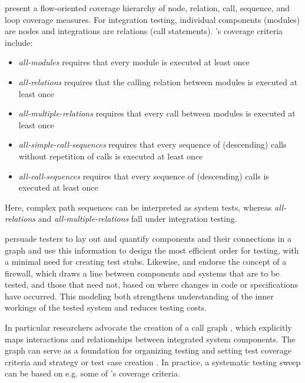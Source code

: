 \documentclass[12pt,a4paper,oneside,pdftex]{report}
\begin{document}
\citet{linnenkugel1990test} present a flow-oriented coverage hierarchy of node, relation, call, sequence, and loop coverage measures. For integration testing, individual components (modules) are nodes and integrations are relations (call statements). \citeauthor{linnenkugel1990test}'s \citeyearpar{linnenkugel1990test} coverage criteria include:
\begin{itemize}
\item \emph{all-modules} requires that every module is executed at least once 
\item \emph{all-relations} requires that the calling relation between modules is executed at least once
\item \emph{all-multiple-relations} requires that every call between modules is executed at least once
\item \emph{all-simple-call-sequences} requires that every sequence of (descending) calls without repetition of calls is executed at least once
\item \emph{all-call-sequences} requires that every sequence of (descending) calls is executed at least once
\end{itemize}
Here, complex path sequences can be interpreted as system tests, whereas \emph{all-relations} and \emph{all-multiple-relations} fall under integration testing.


\citet{hewett2009automated} persuade testers to lay out and quantify components and their connections in a graph and use this information to design the most efficient order for testing, with a minimal need for creating test stubs. Likewise, \citet{leung1990study} and \citet{abdullah1995correcting} endorse the concept of a firewall, which draws a line between components and systems that are to be tested, and those that need not, based on where changes in code or specifications have occurred. This modeling both strengthens understanding of the inner workings of the tested system and reduces testing costs.

In particular researchers advocate the creation of a call graph \citep{leung1990study, hurlburt2012not, linnenkugel1990test}, which explicitly maps interactions and relationships between integrated system components. The graph can serve as a foundation for organizing testing and setting test coverage criteria and strategy or test case creation \citep{benz2007combining, hura2011method, linnenkugel1990test}. In practice, a systematic testing sweep can be based on e.g. some of \citeauthor{linnenkugel1990test}'s \citeyearpar{linnenkugel1990test} coverage criteria. 
\end{document}
